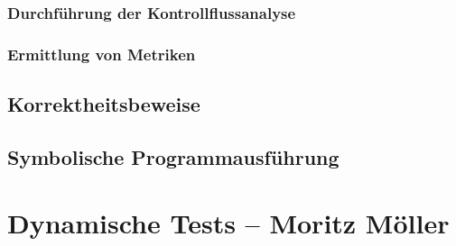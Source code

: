\documentclass[	%
		fontsize=11pt,  %
		a4paper,	    %
		german,		%
		sans,			%
		f4,				%
	]{HsH-report}		%
\begin{document}
		\subsection{Durchführung der Kontrollflussanalyse}
			\lipsum[1]
		\subsection{Ermittlung von Metriken}
			\lipsum[1]
	\section{Korrektheitsbeweise}
		\lipsum[1-2]
	\section{Symbolische Programmausführung}
		\lipsum[1-2]

\chapter{Dynamische Tests -- Moritz Möller} \label{chap: dynamic}
	\lipsum[1-20]

\noindent\begin{minipage}{\textwidth} %
	\printbibliography
	\listoffigures
	\listoftables
\end{minipage}
\end{document}
